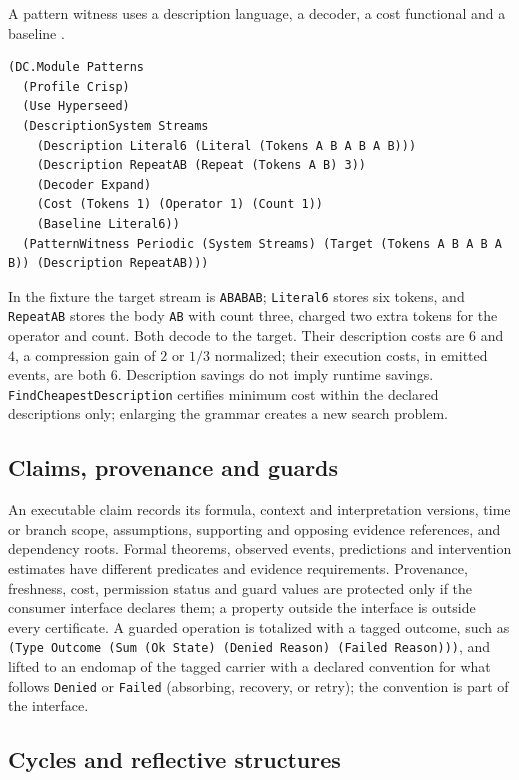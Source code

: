 \documentclass[11pt]{article}
\newcommand{\code}[1]{\texttt{#1}}
\theoremstyle{definition}
\theoremstyle{plain}
\begin{document}
A pattern witness uses a description language, a decoder, a cost functional and a baseline
\cite[Definitions 93--95]{hyperseed}.
\begin{lstlisting}[basicstyle=\ttfamily\footnotesize,title={\scriptsize\ttfamily fixtures/patterns.metta}]
(DC.Module Patterns
  (Profile Crisp)
  (Use Hyperseed)
  (DescriptionSystem Streams
    (Description Literal6 (Literal (Tokens A B A B A B)))
    (Description RepeatAB (Repeat (Tokens A B) 3))
    (Decoder Expand)
    (Cost (Tokens 1) (Operator 1) (Count 1))
    (Baseline Literal6))
  (PatternWitness Periodic (System Streams) (Target (Tokens A B A B A B)) (Description RepeatAB)))
\end{lstlisting}
In the fixture the target stream is \code{ABABAB}; \code{Literal6} stores six tokens, and
\code{RepeatAB} stores the body \code{AB} with count three, charged two extra tokens for the
operator and count. Both decode to the target. Their description costs are $6$ and $4$, a
compression gain of $2$ or $1/3$ normalized; their execution costs, in emitted events, are both
$6$. Description savings do not imply runtime savings. \code{FindCheapestDescription} certifies
minimum cost within the declared descriptions only; enlarging the grammar creates a new search
problem.

\subsection{Claims, provenance and guards}

An executable claim records its formula, context and interpretation versions, time or branch scope,
assumptions, supporting and opposing evidence references, and dependency roots. Formal theorems,
observed events, predictions and intervention estimates have different predicates and evidence
requirements. Provenance, freshness, cost, permission status and guard values are protected only if
the consumer interface declares them; a property outside the interface is outside every certificate.
A guarded operation is totalized with a tagged outcome, such as
\code{(Type Outcome (Sum (Ok State) (Denied Reason) (Failed Reason)))}, and lifted to an endomap of
the tagged carrier with a declared convention for what follows \code{Denied} or \code{Failed}
(absorbing, recovery, or retry); the convention is part of the interface.

\subsection{Cycles and reflective structures}
\end{document}

